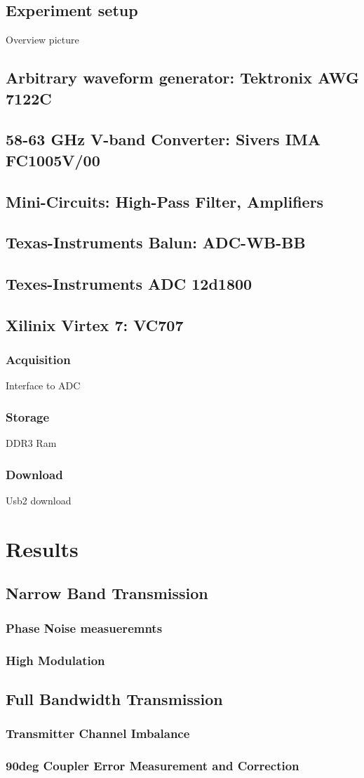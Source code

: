 \section{Experiment setup}
Overview picture

\section{Arbitrary waveform generator: Tektronix AWG 7122C}
\section{58-63 GHz V-band Converter: Sivers IMA FC1005V/00}
\section{Mini-Circuits: High-Pass Filter, Amplifiers}
\section{Texas-Instruments Balun: ADC-WB-BB}
\section{Texes-Instruments ADC 12d1800}

\section{Xilinix Virtex 7: VC707}
\subsection{Acquisition}
Interface to ADC
\subsection{Storage}
DDR3 Ram

\subsection{Download}
Usb2 download

\chapter{Results}
\section{Narrow Band Transmission}
\subsection{Phase Noise measueremnts}
\subsection{High Modulation}

\section{Full Bandwidth Transmission}
\subsection{Transmitter Channel Imbalance}
\subsection{90deg Coupler Error Measurement and Correction}
